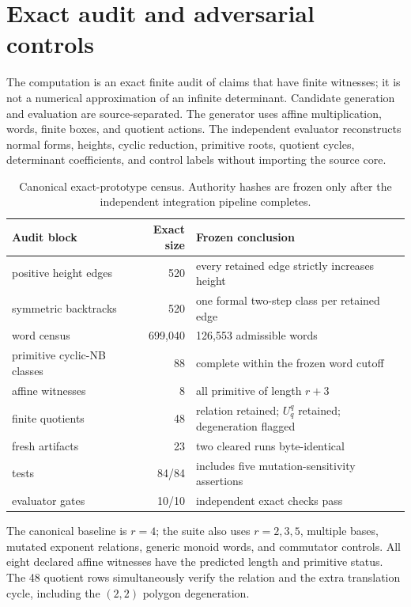 \section{Exact audit and adversarial controls}
\label{sec:audit}

The computation is an exact finite audit of claims that have finite witnesses;
it is not a numerical approximation of an infinite determinant.  Candidate
generation and evaluation are source-separated.  The generator uses affine
multiplication, words, finite boxes, and quotient actions.  The independent
evaluator reconstructs normal forms, heights, cyclic reduction, primitive
roots, quotient cycles, determinant coefficients, and control labels without
importing the source core.

\begin{table}[t]
\centering
\small
\begin{tabularx}{\textwidth}{@{}Y r Y@{}}
\toprule
Audit block & Exact size & Frozen conclusion \\
\midrule
positive height edges & 520 & every retained edge strictly increases height \\
symmetric backtracks & 520 & one formal two-step class per retained edge \\
word census & 699,040 & 126,553 admissible words \\
primitive cyclic-NB classes & 88 & complete within the frozen word cutoff \\
affine witnesses & 8 & all primitive of length $r+3$ \\
finite quotients & 48 & relation retained; $U_q^q$ retained; degeneration flagged \\
fresh artifacts & 23 & two cleared runs byte-identical \\
tests & 84/84 & includes five mutation-sensitivity assertions \\
evaluator gates & 10/10 & independent exact checks pass \\
\bottomrule
\end{tabularx}
\caption{Canonical exact-prototype census.  Authority hashes are frozen only
after the independent integration pipeline completes.}
\label{tab:exact-audit}
\end{table}

The canonical baseline is $r=4$; the suite also uses $r=2,3,5$, multiple
bases, mutated exponent relations, generic monoid words, and commutator
controls.  All eight declared affine witnesses have the predicted length and
primitive status.  The 48 quotient rows simultaneously verify the relation
and the extra translation cycle, including the $(2,2)$ polygon degeneration.

